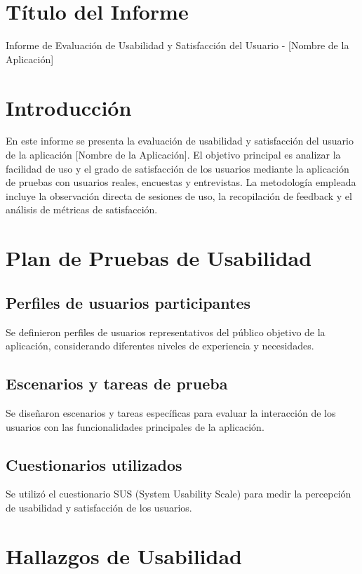\section{Título del Informe}

Informe de Evaluación de Usabilidad y Satisfacción del Usuario - [Nombre de la Aplicación]

\section{Introducción}

En este informe se presenta la evaluación de usabilidad y satisfacción del usuario de la aplicación [Nombre de la Aplicación]. El objetivo principal es analizar la facilidad de uso y el grado de satisfacción de los usuarios mediante la aplicación de pruebas con usuarios reales, encuestas y entrevistas. La metodología empleada incluye la observación directa de sesiones de uso, la recopilación de feedback y el análisis de métricas de satisfacción.

\section{Plan de Pruebas de Usabilidad}

\subsection{Perfiles de usuarios participantes}
Se definieron perfiles de usuarios representativos del público objetivo de la aplicación, considerando diferentes niveles de experiencia y necesidades.

\subsection{Escenarios y tareas de prueba}
Se diseñaron escenarios y tareas específicas para evaluar la interacción de los usuarios con las funcionalidades principales de la aplicación.

\subsection{Cuestionarios utilizados}
Se utilizó el cuestionario SUS (System Usability Scale) para medir la percepción de usabilidad y satisfacción de los usuarios.

\section{Hallazgos de Usabilidad}

